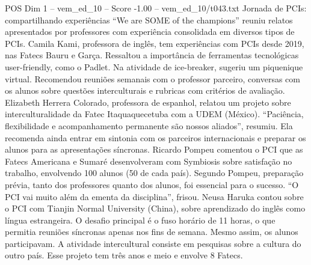 \begin{textsample}{POS Dim 1 – vem\_ed\_10 – Score -1.00 – vem\_ed\_10/t043.txt}  \label{ex:f1_pos_024}
Jornada de PCIs: compartilhando experiências “We are SOME of the champions” reuniu relatos apresentados por professores com experiência consolidada em diversos tipos de PCIs.
Camila Kami, professora de inglês, tem experiências com PCIs desde 2019, nas Fatecs Bauru e Garça.
Ressaltou a importância de ferramentas tecnológicas user-friendly, como o Padlet.
Na atividade de ice-breaker, sugeriu um piquenique virtual.
Recomendou reuniões semanais com o professor parceiro, conversas com os alunos sobre questões interculturais e rubricas com critérios de avaliação.
Elizabeth Herrera Colorado, professora de espanhol, relatou um projeto sobre interculturalidade da Fatec Itaquaquecetuba com a UDEM (México). “Paciência, flexibilidade e acompanhamento permanente são nossos aliados”, resumiu.
Ela recomenda ainda entrar em sintonia com os parceiros internacionais e preparar os alunos para as apresentações síncronas.
Ricardo Pompeu comentou o PCI que as Fatecs Americana e Sumaré desenvolveram com Symbiosis sobre satisfação no trabalho, envolvendo 100 alunos (50 de cada país).
Segundo Pompeu, preparação prévia, tanto dos professores quanto dos alunos, foi essencial para o sucesso. “O PCI vai muito além da ementa da disciplina”, frisou.
Neusa Haruka contou sobre o PCI com Tianjin Normal University (China), sobre aprendizado do inglês como língua estrangeira.
O desafio principal é o fuso horário de 11 horas, o que permitia reuniões síncronas apenas nos fins de semana.
Mesmo assim, os alunos participavam.
A atividade intercultural consiste em pesquisas sobre a cultura do outro país.
Esse projeto tem três anos e meio e envolve 8 Fatecs.

\end{textsample}
